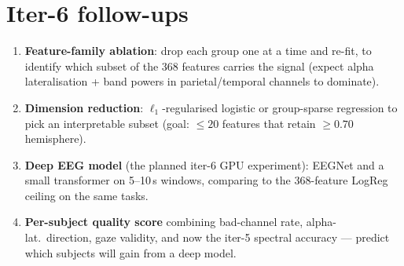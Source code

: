 \section{Iter-6 follow-ups}

\begin{enumerate}
  \item \textbf{Feature-family ablation}: drop each group one at a time
        and re-fit, to identify which subset of the 368 features
        carries the signal (expect alpha lateralisation + band powers
        in parietal/temporal channels to dominate).
  \item \textbf{Dimension reduction}: $\ell_1$-regularised logistic or
        group-sparse regression to pick an interpretable subset (goal:
        $\leq 20$ features that retain $\geq 0.70$ hemisphere).
  \item \textbf{Deep EEG model} (the planned iter-6 GPU experiment):
        EEGNet and a small transformer on 5--10\,s windows, comparing
        to the 368-feature LogReg ceiling on the same tasks.
  \item \textbf{Per-subject quality score} combining bad-channel rate,
        alpha-lat.\ direction, gaze validity, and now the iter-5
        spectral accuracy --- predict which subjects will gain from a
        deep model.
\end{enumerate}
